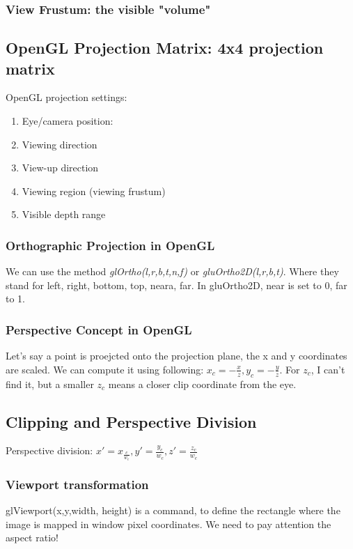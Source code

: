 \documentclass[11pt]{article}
\begin{document}
\subsubsection*{View Frustum: the visible "volume" }

\subsection{OpenGL Projection Matrix: 4x4 projection matrix}
OpenGL projection settings:
\begin{enumerate}
    \item Eye/camera position:
    \item Viewing direction
    \item View-up direction
    \item Viewing region (viewing frustum)
    \item Visible depth range
\end{enumerate}

\subsubsection*{Orthographic Projection in OpenGL}
We can use the method \textit{glOrtho(l,r,b,t,n,f)} or \textit{gluOrtho2D(l,r,b,t)}. Where they stand for left, right, bottom, top, neara, far. In gluOrtho2D, near is set to 0, far to 1.

\subsubsection*{Perspective Concept in OpenGL}
Let's say a point is proejcted onto the projection plane, the x and y coordinates are scaled. We can compute it using following: $x_c = -\frac{x}{z}, y_c = - \frac{y}{z}$. For $z_c$, I can't find it, but a smaller $z_c$ means a closer clip coordinate from the eye.    

\subsection{Clipping and Perspective Division}
Perspective division: $x' = x_\frac{c}{w_c}, y' = \frac{y_c}{w_c}, z' = \frac{z_c}{w_c}$ 


\subsubsection*{Viewport transformation}
glViewport(x,y,width, height) is a command, to define the rectangle where the image is mapped in window pixel coordinates. 
We need to pay attention the aspect ratio!
\end{document}

